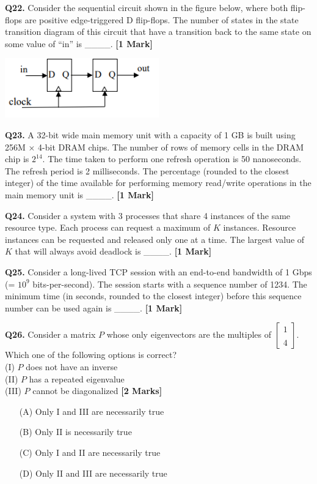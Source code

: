 \documentclass[11pt]{article}
\newcommand{\questiona}[2]{
    \noindent\textbf{Q#2.} #1 \hfill \textbf{[1 Mark]}
}
\newcommand{\questionb}[2]{
    \noindent\textbf{Q#2.} #1 \hfill \textbf{[2 Marks]}
}
\begin{document}
\questiona{Consider the sequential circuit shown in the figure below, where both flip-flops are positive edge-triggered D flip-flops. The number of states in the state transition diagram of this circuit that have a transition back to the same state on some value of “in” is \_\_\_\_.}{22}
\includegraphics[width=0.5\textwidth]{figures/22}
\vspace{0.5cm}

\questiona{A 32-bit wide main memory unit with a capacity of 1 GB is built using 256M × 4-bit DRAM chips. The number of rows of memory cells in the DRAM chip is \( 2^{14} \). The time taken to perform one refresh operation is 50 nanoseconds. The refresh period is 2 milliseconds. The percentage (rounded to the closest integer) of the time available for performing memory read/write operations in the main memory unit is \_\_\_\_.}{23}
\vspace{0.5cm}

\questiona{Consider a system with 3 processes that share 4 instances of the same resource type. Each process can request a maximum of \( K \) instances. Resource instances can be requested and released only one at a time. The largest value of \( K \) that will always avoid deadlock is \_\_\_\_.}{24}
\vspace{0.5cm}

\questiona{Consider a long-lived TCP session with an end-to-end bandwidth of 1 Gbps (= \(10^9\) bits-per-second). The session starts with a sequence number of 1234. The minimum time (in seconds, rounded to the closest integer) before this sequence number can be used again is \_\_\_\_.}{25}
\vspace{0.5cm}

\questionb{Consider a matrix \( P \) whose only eigenvectors are the multiples of \( \begin{bmatrix} 1 \\\\ 4 \end{bmatrix} \).\\
Which one of the following options is correct?\\
(I) \( P \) does not have an inverse\\
(II) \( P \) has a repeated eigenvalue\\
(III) \( P \) cannot be diagonalized}{26}
\begin{enumerate}
    \item[(A)] Only I and III are necessarily true
    \item[(B)] Only II is necessarily true
    \item[(C)] Only I and II are necessarily true
    \item[(D)] Only II and III are necessarily true
\end{enumerate}
\vspace{0.5cm}
\end{document}
